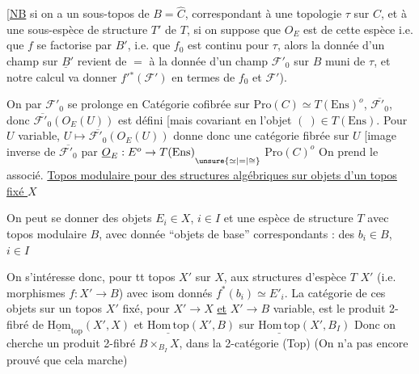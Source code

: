 [\uline{NB} si on a un sous-topos  de $B=\widehat C$, correspondant à une
topologie $\tau$ sur $C$, et à une sous-espèce de structure
$T'$ de $T$,  si on suppose que $O_E$ est de
cette espèce i.e. que $f$ se factorise  par $B'$, i.e.
que $f_0$ est continu pour $\tau$, alors la donnée d'un
champ  sur $\underline B'$ revient de $=$ à la donnée d'un
champ $\mathcal F'_0$ sur $B$ muni de $\tau$, et \unsure{]} notre calcul
va donner $f'{}^*(\mathcal F')$ en termes de $f_0$ et $\mathcal F'$).

On  par 
 $\mathcal F'_0$  se prolonge en Catégorie cofibrée sur
$\mathrm{Pro}(C)\simeq T(\mathrm{Ens})^o$,  $\overline{\mathcal F'_0}$, donc $\overline{\mathcal F'_0}(O_E(U))$
est défini [mais covariant en l'objet $(\ )\in T(\mathrm{Ens})$.
Pour $U$ variable, $U\longmapsto\overline{\mathcal F'_0}(O_E(U))$ donne donc une
catégorie fibrée sur $U$ [image inverse de $\overline{\mathcal F'_0}$ par $\underline O_E:E^o\to T(\mathrm{Ens})\underset{\unsure{\simeq|=|\cong}}{\vphantom A}$
$\mathrm{Pro}(C)^o$
On prend le  associé.
\uline{Topos modulaire pour des structures algébriques
 sur objets  d'un topos fixé  $X$}

 On peut se donner des objets $E_i\in X$, $i\in I$
et  une espèce de structure $T$ avec
topos modulaire $B$,  avec donnée
``objets de base'' correspondants : des $b_i\in B$, $i\in I$

On s'intéresse donc, pour tt topos $X'$ sur $X$,
aux structures d'espèce $T$  $X'$ 
(i.e. morphismes $f:X'\longrightarrow B$)  avec
isom donnés $f^*(b_i)\simeq E'_i$. La catégorie
de ces objets sur un topos $X'$
fixé, pour $X'\longrightarrow X$ \uline{et} $X'\longrightarrow B$
variable, est le produit 2-fibré de $\underline{\mathrm{Hom}}_{\mathrm{top}}(X',X)$ et
$\underline{\mathrm{Hom}\,\mathrm{top}}(X',B)$ sur $\underline{\mathrm{Hom}\,\mathrm{top}}(X',B_I)$
Donc on cherche un produit
2-fibré $B\times_{B_I}X$, dans la 2-catégorie (Top)
(On n'a pas encore prouvé que cela marche)

